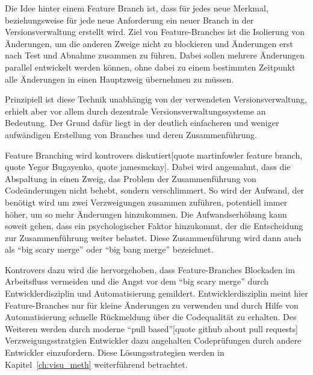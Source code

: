Die Idee hinter einem Feature Branch ist, dass für jedes neue Merkmal, beziehungsweise für jede neue Anforderung ein neuer Branch in der Versionsverwaltung erstellt wird. Ziel von Feature-Branches ist die Isolierung von Änderungen, um die anderen Zweige nicht zu blockieren und Änderungen erst nach Test und Abnahme zusammen zu führen. Dabei sollen mehrere Änderungen parallel entwickelt werden können, ohne dabei zu einem bestimmten Zeitpunkt alle Änderungen in einen Hauptzweig übernehmen zu müssen.

Prinzipiell ist diese Technik unabhängig von der verwendeten Versionsverwaltung, erhielt aber vor allem durch dezentrale Versionsverwaltungssysteme an Bedeutung. Der Grund dafür liegt in der deutlich einfacheren und weniger aufwändigen Erstellung von Branches und deren Zusammenführung.

Feature Branching wird kontrovers diskutiert[quote martinfowler feature branch, quote Yegor Bugayenko, quote jamesmckay]. Dabei wird angemahnt, dass die Abspaltung in einen Zweig, das Problem der Zusammenführung von Codeänderungen nicht behebt, sondern verschlimmert. So wird der Aufwand, der benötigt wird um zwei Verzweigungen zusammen zuführen, potentiell immer höher, um so mehr Änderungen hinzukommen. Die Aufwandserhöhung kann soweit gehen, dass ein psychologischer Faktor hinzukommt, der die Entscheidung zur Zusammenführung weiter belastet. Diese Zusammenführung wird dann auch als ``big scary merge'' oder ``big bang merge'' bezeichnet.

Kontrovers dazu wird die hervorgehoben, dass Feature-Branches Blockaden im Arbeitsfluss vermeiden und die Angst vor dem ``big scary merge'' durch Entwicklerdisziplin und Automatisierung gemildert. Entwicklerdisziplin meint hier Feature-Branches nur für kleine Änderungen zu verwenden und durch Hilfe von Automatisierung schnelle Rückmeldung über die Codequalität zu erhalten. Des Weiteren werden durch moderne ``pull based''[quote github about pull requests] Verzweigungsstratgien Entwickler dazu angehalten Codeprüfungen durch andere Entwickler einzufordern. Diese Lösungsstrategien werden in Kapitel~\ref{ch:visu_meth} weiterführend betrachtet.
